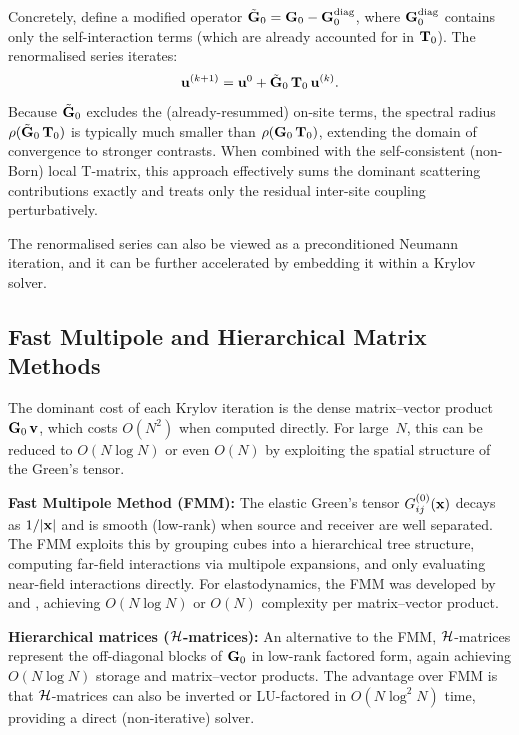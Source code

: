 Concretely, define a modified operator
$\tilde{\mathbf{G}}_0 = \mathbf{G}_0 - \mathbf{G}_0^{\text{diag}}$, where
$\mathbf{G}_0^{\text{diag}}$ contains only the self-interaction terms (which are
already accounted for in $\mathbf{T}_0$).  The renormalised series iterates:
\begin{equation}
  \mathbf{u}^{(k+1)} = \mathbf{u}^0 + \tilde{\mathbf{G}}_0\,\mathbf{T}_0\,\mathbf{u}^{(k)}.
\label{eq:renorm}
\end{equation}
Because $\tilde{\mathbf{G}}_0$ excludes the (already-resummed) on-site terms, the
spectral radius $\rho(\tilde{\mathbf{G}}_0\,\mathbf{T}_0)$ is typically much smaller
than $\rho(\mathbf{G}_0\,\mathbf{T}_0)$, extending the domain of convergence to stronger
contrasts.  When combined with the self-consistent (non-Born) local
T-matrix, this approach effectively sums the dominant scattering
contributions exactly and treats only the residual inter-site coupling
perturbatively.

The renormalised series can also be viewed as a preconditioned Neumann
iteration, and it can be further accelerated by embedding it within a
Krylov solver.

\subsection{Fast Multipole and Hierarchical Matrix Methods}

The dominant cost of each Krylov iteration is the dense matrix--vector
product $\mathbf{G}_0\,\mathbf{v}$, which costs $O(N^2)$ when computed directly.  For
large~$N$, this can be reduced to $O(N\log N)$ or even $O(N)$ by
exploiting the spatial structure of the Green's tensor.

\textbf{Fast Multipole Method (FMM):}  The elastic Green's tensor
$G_{ij}^{(0)}(\mathbf{x})$ decays as $1/|\mathbf{x}|$ and is smooth (low-rank) when
source and receiver are well separated.  The
FMM \citep{Rokhlin1985,GreengardRokhlin1987} exploits this by grouping
cubes into a hierarchical tree structure, computing far-field interactions
via multipole expansions, and only evaluating near-field interactions
directly.  For elastodynamics, the FMM was developed by
\citet{Fujiwara2000} and \citet{Chaillat2008},
achieving $O(N\log N)$ or $O(N)$ complexity per matrix--vector product.

\textbf{Hierarchical matrices ($\mathcal{H}$-matrices):}  An alternative to the
FMM, $\mathcal{H}$-matrices \citep{Hackbusch1999,Boerm2003} represent the
off-diagonal blocks of $\mathbf{G}_0$ in low-rank factored form, again achieving
$O(N\log N)$ storage and matrix--vector products.  The advantage over FMM
is that $\mathcal{H}$-matrices can also be inverted or LU-factored in
$O(N\log^2 N)$ time, providing a direct (non-iterative) solver.

